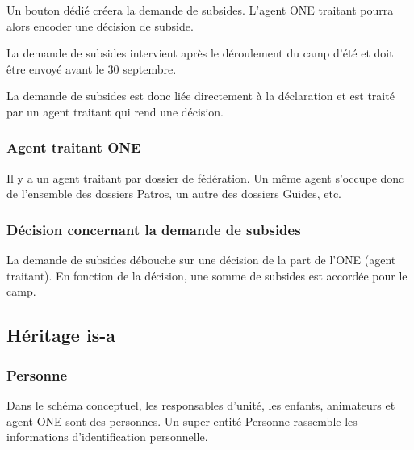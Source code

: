 Un bouton dédié créera la demande de subsides. L'agent ONE traitant pourra alors encoder une décision de subside.

La demande de subsides intervient après le déroulement du camp d'été et doit être envoyé avant le 30 septembre. 



La demande de subsides est donc liée directement à la déclaration et est traité par un agent traitant qui rend une décision. 

\subsubsection{Agent traitant ONE}
Il y a un agent traitant par dossier de fédération. Un même agent s'occupe donc de l'ensemble des dossiers Patros, un autre des dossiers Guides, etc. 


\subsubsection{Décision concernant la demande de subsides}
La demande de subsides débouche sur une décision de la part de l'ONE (agent traitant). En fonction de la décision, une somme de subsides est accordée pour le camp.


\subsection{Héritage is-a}

\subsubsection{Personne}
Dans le schéma conceptuel, les responsables d'unité, les enfants, animateurs et agent ONE sont des personnes. Un super-entité Personne rassemble les informations d'identification personnelle. 
